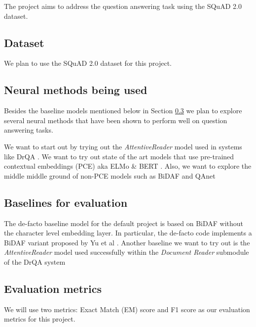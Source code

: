 The project aims to address the question answering task using the SQuAD 2.0 dataset.

\subsection{Dataset}
\label{subsec:projectdataset}

We plan to use the SQuAD 2.0 dataset for this project.

\subsection{Neural methods being used}
\label{subsec:projectmethods}

Besides the baseline models mentioned below in Section \ref{subsec:projectbaselines} we plan to explore several neural methods that have been shown to perform well on question answering tasks.

We want to start out by trying out the \textit{AttentiveReader} model used in systems like DrQA \cite{chen2017reading}. We want to try out state of the art models that use pre-trained contextual embeddings (PCE) aka ELMo \cite{peters2018deep} \& BERT \cite{devlin2018bert}. Also, we want to explore the middle middle ground of non-PCE models such as BiDAF \cite{seo2016bidirectional} and QAnet \cite{yu2018qanet} 


\subsection{Baselines for evaluation}
\label{subsec:projectbaselines}

The de-facto baseline model for the default project is based on BiDAF \cite{seo2016bidirectional} without the character level embedding layer. In particular, the de-facto code implements a BiDAF variant proposed by Yu et al \cite{yu2018qanet}.  Another baseline we want to try out is the \textit{AttentiveReader} model \cite{hermann2015teaching} used successfully within the \textit{Document Reader} submodule of the DrQA system \cite{chen2017reading}

\subsection{Evaluation metrics}
\label{subsec:projectmetrics}

We will use two metrics: Exact Match (EM) score and F1 score as our evaluation metrics for this project.

